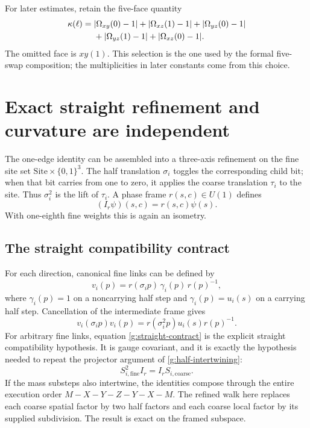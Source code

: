 For later estimates, retain the five-face quantity
\begin{align}
 \kappa(\ell)={}&|\Omega_{xy}(0)-1|+|\Omega_{xz}(1)-1|
  +|\Omega_{yz}(0)-1|\notag\\
 &+|\Omega_{yz}(1)-1|+|\Omega_{xz}(0)-1|.
 \label{g:fiveface}
\end{align}
The omitted face is $xy(1)$. This selection is the one used by the formal five-swap composition; the multiplicities in later constants come from this choice.




\section{Exact straight refinement and curvature are independent}
\label{g:independence}
The one-edge identity can be assembled into a three-axis refinement on the fine site set $\mathrm{Site}\times\{0,1\}^3$. The half translation $\sigma_i$ toggles the corresponding child bit; when that bit carries from one to zero, it applies the coarse translation $\tau_i$ to the site. Thus $\sigma_i^2$ is the lift of $\tau_i$. A phase frame $r(s,c)\in U(1)$ defines
\[
 (I_r\psi)(s,c)=r(s,c)\psi(s).
\]
With one-eighth fine weights this is again an isometry.

\subsection{The straight compatibility contract}
For each direction, canonical fine links can be defined by
\[
 v_i(p)=r(\sigma_i p)\,\gamma_i(p)\,r(p)^{-1},
\]
where $\gamma_i(p)=1$ on a noncarrying half step and $\gamma_i(p)=u_i(s)$ on a carrying half step. Cancellation of the intermediate frame gives
\begin{equation}
 v_i(\sigma_i p)v_i(p)
 =r(\sigma_i^2p)u_i(s)r(p)^{-1}.
 \label{g:straight-contract}
\end{equation}
For arbitrary fine links, equation \eqref{g:straight-contract} is the explicit straight compatibility hypothesis. It is gauge covariant, and it is exactly the hypothesis needed to repeat the projector argument of \eqref{g:half-intertwining}:
\[
 S_{i,\mathrm{fine}}^2 I_r=I_rS_{i,\mathrm{coarse}}.
\]
If the mass substeps also intertwine, the identities compose through the entire execution order $M-X-Y-Z-Y-X-M$. The refined walk here replaces each coarse spatial factor by two half factors and each coarse local factor by its supplied subdivision. The result is exact on the framed subspace.

